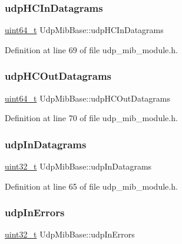 \subsubsection{\texorpdfstring{udp\+H\+C\+In\+Datagrams}{udpHCInDatagrams}}
{\footnotesize\ttfamily \hyperlink{stdint_8h_aec6fcb673ff035718c238c8c9d544c47}{uint64\+\_\+t} Udp\+Mib\+Base\+::udp\+H\+C\+In\+Datagrams}



Definition at line 69 of file udp\+\_\+mib\+\_\+module.\+h.

\mbox{\label{structUdpMibBase_acd678f88448b8d079599835c2e5d07d9}} 
\subsubsection{\texorpdfstring{udp\+H\+C\+Out\+Datagrams}{udpHCOutDatagrams}}
{\footnotesize\ttfamily \hyperlink{stdint_8h_aec6fcb673ff035718c238c8c9d544c47}{uint64\+\_\+t} Udp\+Mib\+Base\+::udp\+H\+C\+Out\+Datagrams}



Definition at line 70 of file udp\+\_\+mib\+\_\+module.\+h.

\mbox{\label{structUdpMibBase_ae287eb0668fa213e85f26f5045cce96b}} 
\subsubsection{\texorpdfstring{udp\+In\+Datagrams}{udpInDatagrams}}
{\footnotesize\ttfamily \hyperlink{stdint_8h_a435d1572bf3f880d55459d9805097f62}{uint32\+\_\+t} Udp\+Mib\+Base\+::udp\+In\+Datagrams}



Definition at line 65 of file udp\+\_\+mib\+\_\+module.\+h.

\mbox{\label{structUdpMibBase_adcfaf49489019be57bf31db1b89f8dfa}} 
\subsubsection{\texorpdfstring{udp\+In\+Errors}{udpInErrors}}
{\footnotesize\ttfamily \hyperlink{stdint_8h_a435d1572bf3f880d55459d9805097f62}{uint32\+\_\+t} Udp\+Mib\+Base\+::udp\+In\+Errors}



